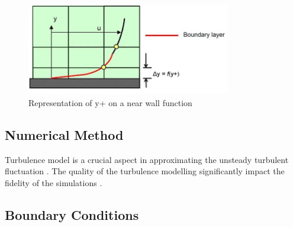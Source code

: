 \begin{figure}[!ht]
    \centering
    \includegraphics[height=4cm]{Figures/inflation_layer.jpg}
    \caption{Representation of y+ on a near wall function \cite{Anonymous2013Inflate4Blog}}
    \label{fig:inflation layer}
\end{figure}


\subsection{Numerical Method}
Turbulence model is a crucial aspect in approximating the unsteady turbulent fluctuation \cite{Cummings2015AppliedAerodynamics}. The quality of the turbulence modelling significantly impact the fidelity of the simulations \cite{Lanfrit2005BestFLUENT}.  

















\subsection{Boundary Conditions}

